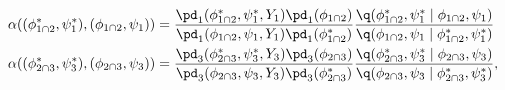 \begin{align}
  \alpha((\phi_{1 \cap 2}^{*}, \psi_{1}^{*}), (\phi_{1 \cap 2}, \psi_{1})) &= 
  \frac {
    \pd_{1}(\phi_{1 \cap 2}^{*}, \psi_{1}^{*}, Y_{1})
    \pd_{1}(\phi_{1 \cap 2})
  } {
    \pd_{1}(\phi_{1 \cap 2}, \psi_{1}, Y_{1})
    \pd_{1}(\phi_{1 \cap 2}^{*})
  }
  \frac {
    \q(\phi_{1 \cap 2}^{*}, \psi_{1}^{*} \mid \phi_{1 \cap 2}, \psi_{1})
  } {
    \q(\phi_{1 \cap 2}, \psi_{1} \mid \phi_{1 \cap 2}^{*}, \psi_{1}^{*})
  } \\
  \alpha((\phi_{2 \cap 3}^{*}, \psi_{3}^{*}), (\phi_{2 \cap 3}, \psi_{3})) &= 
  \frac {
    \pd_{3}(\phi_{2 \cap 3}^{*}, \psi_{3}^{*}, Y_{3})
    \pd_{3}(\phi_{2 \cap 3})
  } {
    \pd_{3}(\phi_{2 \cap 3}, \psi_{3}, Y_{3})
    \pd_{3}(\phi_{2 \cap 3}^{*})
  }
  \frac {
    \q(\phi_{2 \cap 3}^{*}, \psi_{3}^{*} \mid \phi_{2 \cap 3}, \psi_{3})
  } {
    \q(\phi_{2 \cap 3}, \psi_{3} \mid \phi_{2 \cap 3}^{*}, \psi_{3}^{*})
  },  
  \label{eqn:stage-one-acceptance-probs}  
\end{align}